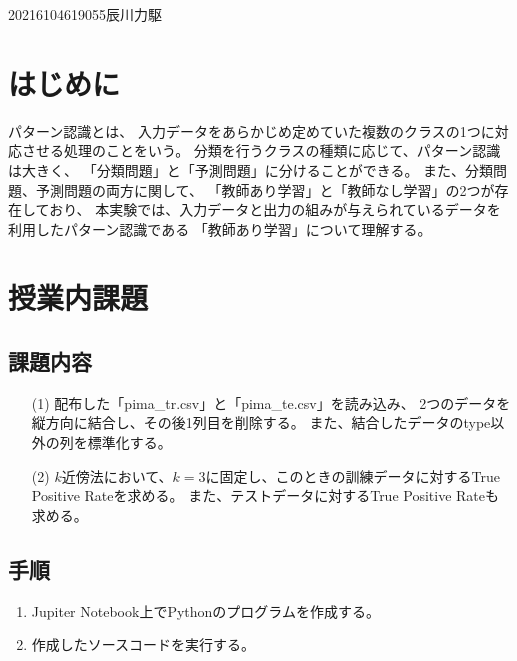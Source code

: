 \documentclass[12pt]{jarticle}
\begin{document}
{2021}{6}{10}{4619055}{辰川力駆}
\section{はじめに}
パターン認識とは、
入力データをあらかじめ定めていた複数のクラスの1つに対応させる処理のことをいう。
分類を行うクラスの種類に応じて、パターン認識は大きく、
「分類問題」と「予測問題」に分けることができる。
また、分類問題、予測問題の両方に関して、
「教師あり学習」と「教師なし学習」の2つが存在しており、
本実験では、入力データと出力の組みが与えられているデータを利用したパターン認識である
「教師あり学習」について理解する。


\section{授業内課題}
\subsection{課題内容}
\begin{itemize}
    \item [(1)]配布した「pima\_tr.csv」と「pima\_te.csv」を読み込み、
          2つのデータを縦方向に結合し、その後1列目を削除する。
          また、結合したデータのtype以外の列を標準化する。
    \item [(2)]$k$近傍法において、$k=3$に固定し、このときの訓練データに対するTrue Positive Rateを求める。
          また、テストデータに対するTrue Positive Rateも求める。
\end{itemize}
\subsection{手順}
\begin{enumerate}
    \item Jupiter Notebook上でPythonのプログラムを作成する。
    \item 作成したソースコードを実行する。
\end{enumerate}
\end{document}
